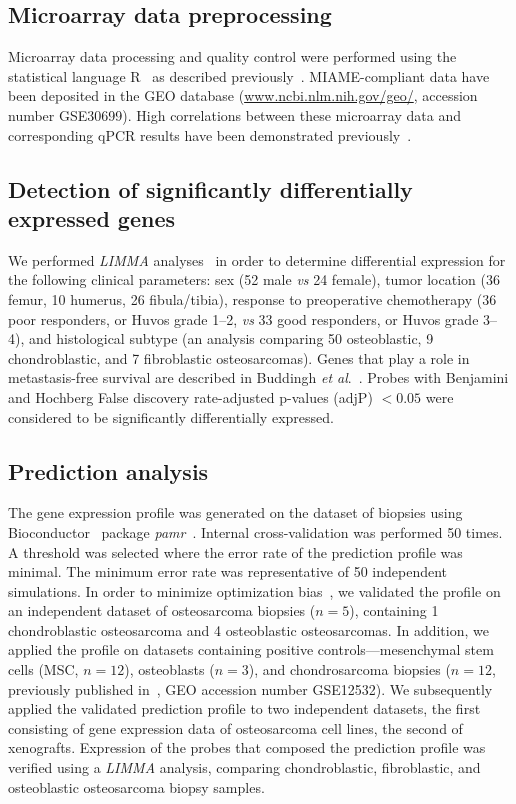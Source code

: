 \subsection{Microarray data preprocessing}
Microarray data processing and quality control were
performed using the statistical language R~\cite{r2.10.0} as
described previously~\cite{buddingh2011tumor}. MIAME\hyp{}compliant data have
been deposited in the GEO database (\url{www.ncbi.nlm.nih.gov/geo/}, accession number GSE30699). High
correlations between these microarray data and corresponding
qPCR results have been demonstrated previously~\cite{buddingh2011tumor}.

\subsection{Detection of significantly differentially expressed genes}
We performed {\it LIMMA} analyses~\cite{smyth2004linear} in order to determine
differential expression for the following clinical
parameters: sex (52 male {\it vs} 24 female), tumor location
(36 femur, 10 humerus, 26 fibula/tibia), response to preoperative
chemotherapy (36 poor responders, or Huvos
grade 1--2, {\it vs} 33 good responders, or Huvos grade 3--4),
and histological subtype (an analysis comparing
50 osteoblastic, 9 chondroblastic, and 7 fibroblastic
osteosarcomas). Genes that play a role in metastasis\hyp{}free
survival are described in Buddingh {\it et al}.~\cite{buddingh2011tumor}. Probes
with Benjamini and Hochberg False discovery rate\hyp{}adjusted
p-values (adjP) $< 0.05$ were considered to be
significantly differentially expressed.

\subsection{Prediction analysis}
The gene expression profile was generated on the dataset
of biopsies using Bioconductor~\cite{gentleman2004bioconductor} package {\it pamr}~\cite{tibshirani2002diagnosis}. Internal cross\hyp{}validation was performed 50 times.
A threshold was selected where the error rate of the
prediction profile was minimal. The minimum error rate
was representative of 50 independent simulations. In
order to minimize optimization bias~\cite{wood2007classification}, we validated
the profile on an independent dataset of osteosarcoma
biopsies ($n=5$), containing 1 chondroblastic
osteosarcoma and 4 osteoblastic osteosarcomas. In addition,
we applied the profile on datasets containing positive
controls---mesenchymal stem cells (MSC, $n=12$),
osteoblasts ($n=3$), and chondrosarcoma biopsies ($n=12$, previously published in~\cite{hallor2009genomic}, GEO accession number
GSE12532). We subsequently applied the validated prediction
profile to two independent datasets, the first
consisting of gene expression data of osteosarcoma cell
lines, the second of xenografts. Expression of the probes
that composed the prediction profile was verified using
a {\it LIMMA} analysis, comparing chondroblastic,
fibroblastic, and osteoblastic osteosarcoma biopsy
samples.

